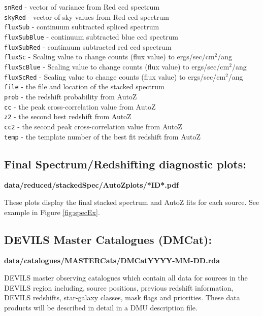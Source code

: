 \documentclass[12pt]{article}
\begin{document}
\texttt{snRed} - vector of variance from Red ccd spectrum\\
\texttt{skyRed} - vector of sky values from Red ccd spectrum\\
\texttt{fluxSub} - continuum subtracted spliced spectrum \\
\texttt{fluxSubBlue} - continuum subtracted blue ccd spectrum \\
\texttt{fluxSubRed} - continuum subtracted red ccd spectrum \\
\texttt{fluxSc} - Scaling value to change counts (flux value) to ergs/sec/cm$^2$/ang\\
\texttt{fluxScBlue} - Scaling value to change counts (flux value) to ergs/sec/cm$^2$/ang\\
\texttt{fluxScRed}  - Scaling value to change counts (flux value) to ergs/sec/cm$^2$/ang\\
\texttt{file} - the file and location of the stacked spectrum\\
\texttt{prob} - the redshift probability from AutoZ\\
\texttt{cc} - the peak cross-correlation value from AutoZ\\
\texttt{z2} - the second best redshift from AutoZ\\
\texttt{cc2} - the second peak cross-correlation value from AutoZ\\
\texttt{temp} - the template number of the best fit redshift from AutoZ \\


  \subsection{Final Spectrum/Redshifting diagnostic plots:}
  
  \textbf{data/reduced/stackedSpec/AutoZplots/*ID*.pdf} 
  
  These plots display the final stacked spectrum and AutoZ fits for each source. See example in Figure \ref{fig:specEx}.
 
 \subsection{DEVILS Master Catalogues (DMCat):}
 
\textbf{data/catalogues/MASTERCats/DMCatYYYY-MM-DD.rda} 
   
DEVILS master observing catalogues which contain all data for sources in the DEVILS region including, source positions, previous redshift information, DEVILS redshifts, star-galaxy classes, mask flags and priorities. These data products will be described in detail in a DMU description file.
 
\end{document}
